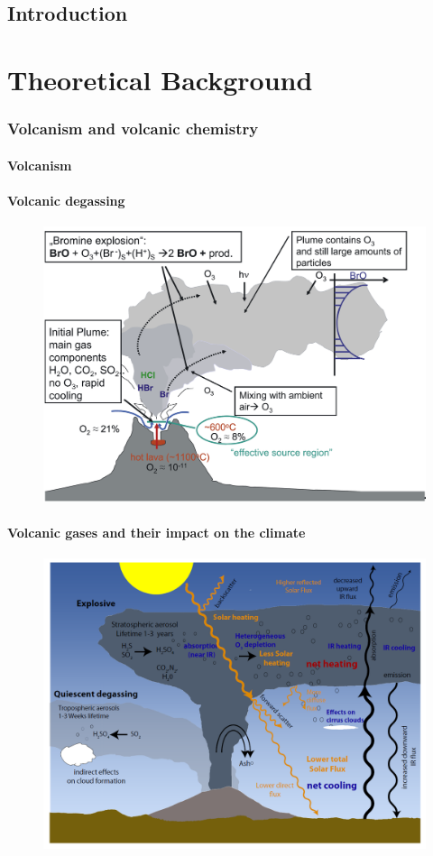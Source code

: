 \documentclass  [
  paper    = a4,
  BCOR     = 10mm,
  twoside,
  fontsize = 12pt,
  fleqn,
  toc      = bibnumbered,
  toc      = listofnumbered,
  numbers  = noendperiod,
  headings = normal,
  listof   = leveldown,
  version  = 3.03
]                                       {scrreprt}
\begin{document}
  

  \tableofcontents
	\chapter{Introduction}	
	
	\part{Theoretical Background}
	\section{Volcanism and volcanic chemistry}

	
	\subsection{Volcanism}
	\subsection{Volcanic degassing}
		\begin{figure}
		\centering
		\includegraphics[width=0.7\linewidth]{Bilder/Simon/Bilder_Tung/BrO_Plume}
		\caption{}
		\label{fig:broplume}
	\end{figure}
	\subsection{Volcanic gases and their impact on the climate}
	\begin{figure}
		\centering
		\includegraphics[width=0.7\linewidth]{Bilder/Simon/Bilder_Tung/Climate_Influence}
		\caption{}
		\label{fig:climateinfluence}
	\end{figure}
	
\end{document}
